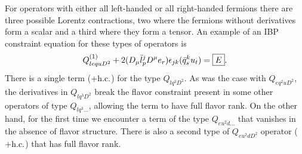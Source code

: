 \begin{enumerate}
For operators with either all left-handed or all right-handed fermions there are three possible Lorentz contractions, two where the fermions without derivatives form a scalar and a third where they form a tensor.
An example of an IBP constraint equation for these types of operators is
\begin{equation}
Q_{lequD^2}^{(1)} + 2 (D_\mu \bar l_p^j D^\mu e_r) \epsilon_{jk} (\bar q_s^k u_t) =  \fbox{$E$} .
\end{equation}
There is a single term ($+ \mathrm{h.c.}$) for the type $Q_{lq^3D^2}$.
As was the case with $Q_{eq^2uD^2}$, the derivatives in $Q_{lq^3D^2}$ break the flavor constraint present in some other operators of type $Q_{lq^3\ldots}$, allowing the term to have full flavor rank.
On the other hand, for the first time we encounter a term of the type $Q_{eu^2d\ldots}$ that vanishes in the absence of flavor structure.
There is also a second type of $Q_{eu^2dD^2}$ operator ($+ \mathrm{h.c.}$) that has full flavor rank.

\end{enumerate}
